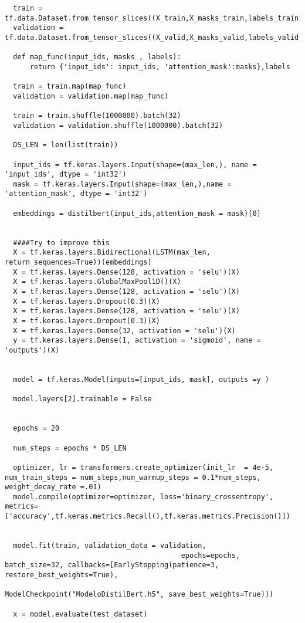 \documentclass[10pt,riqno,a4paper,twoside]{article}\usepackage[]{graphicx}\usepackage[]{color}
\begin{document}
\begin{lstlisting}
  train = tf.data.Dataset.from_tensor_slices((X_train,X_masks_train,labels_train))
  validation = tf.data.Dataset.from_tensor_slices((X_valid,X_masks_valid,labels_valid))

  def map_func(input_ids, masks , labels):
      return {'input_ids': input_ids, 'attention_mask':masks},labels

  train = train.map(map_func)
  validation = validation.map(map_func)

  train = train.shuffle(1000000).batch(32)
  validation = validation.shuffle(1000000).batch(32)

  DS_LEN = len(list(train))

  input_ids = tf.keras.layers.Input(shape=(max_len,), name = 'input_ids', dtype = 'int32')
  mask = tf.keras.layers.Input(shape=(max_len,),name = 'attention_mask', dtype = 'int32')

  embeddings = distilbert(input_ids,attention_mask = mask)[0]


  ####Try to improve this 
  X = tf.keras.layers.Bidirectional(LSTM(max_len, return_sequences=True))(embeddings)
  X = tf.keras.layers.Dense(128, activation = 'selu')(X)
  X = tf.keras.layers.GlobalMaxPool1D()(X)
  X = tf.keras.layers.Dense(128, activation = 'selu')(X)
  X = tf.keras.layers.Dropout(0.3)(X)
  X = tf.keras.layers.Dense(128, activation = 'selu')(X)
  X = tf.keras.layers.Dropout(0.3)(X)
  X = tf.keras.layers.Dense(32, activation = 'selu')(X)
  y = tf.keras.layers.Dense(1, activation = 'sigmoid', name = 'outputs')(X)


  model = tf.keras.Model(inputs=[input_ids, mask], outputs =y )

  model.layers[2].trainable = False


  epochs = 20

  num_steps = epochs * DS_LEN

  optimizer, lr = transformers.create_optimizer(init_lr  = 4e-5, num_train_steps = num_steps,num_warmup_steps = 0.1*num_steps, weight_decay_rate =.01)
  model.compile(optimizer=optimizer, loss='binary_crossentropy', metrics=['accuracy',tf.keras.metrics.Recall(),tf.keras.metrics.Precision()])


  model.fit(train, validation_data = validation, 
                                          epochs=epochs, batch_size=32, callbacks=[EarlyStopping(patience=3, restore_best_weights=True), 
                                        ModelCheckpoint("ModeloDistilBert.h5", save_best_weights=True)])

  x = model.evaluate(test_dataset)
     

\end{lstlisting}
\end{document}
